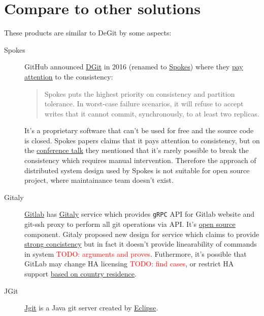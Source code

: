 \documentclass[nonacm=true]{acmart}
\newcommand{\code}[1]{\texttt{#1}}
\newcommand{\todo}[1]{\textcolor{red}{TODO: #1}}
\begin{document}
\section{Compare to other solutions}

These products are similar to DeGit by some aspects:
\begin{description}
  \item[Spokes]
    GitHub announced \href{https://github.blog/2016-04-05-introducing-dgit/}{DGit}
    in 2016 (renamed to \href{https://github.blog/2016-09-07-building-resilience-in-spokes/}{Spokes})
    where they \href{https://github.blog/2016-09-07-building-resilience-in-spokes/#defining-resilience}{pay attention}
    to the consistency:
    \begin{quote}
      Spokes puts the highest priority on consistency and partition tolerance.
      In worst-case failure scenarios, it will refuse to accept writes that it cannot commit,
      synchronously, to at least two replicas.
    \end{quote}
    It's a proprietary software that can't be used for free and the source code is closed.
    Spokes papers claims that it pays attention to consistency, but on the
    \href{https://www.youtube.com/watch?v=DY0yNRNkYb0}{conference talk} they mentioned that
    it's rarely possible to break the consistency which requires manual intervention.
    Therefore the approach of distributed system design used by Spokes is not suitable for open
    source project, where maintainance team doesn't exist.
  \item[Gitaly]
    \href{https://docs.gitlab.com/ee/README.html}{Gitlab} has
    \href{https://docs.gitlab.com/ee/administration/gitaly/}{Gitaly} service which provides
    \code{gRPC} API for Gitlab website and git-ssh proxy to perform all git operations via API.
    It's \href{https://gitlab.com/gitlab-org/gitaly}{open source} component.
    Gitaly proposed new design for service which claims to provide
    \href{https://gitlab.com/gitlab-org/gitaly/-/blob/master/doc/design\_ha.md\#strong-consistency-design}{strong concistency}
    but in fact it doesn't provide linearability of commands in system \todo{arguments and proves}.
    Futhermore, it's possible that GitLab may change HA licensing \todo{find cases},
    or restrict HA support \href{https://news.ycombinator.com/item?id=21437334}{based on country residence}.
  \item[JGit]
    \href{https://www.eclipse.org/jgit/}{Jgit} is a Java git server created by \href{https://www.eclipse.org/}{Eclipse}.

\end{description}
\end{document}
